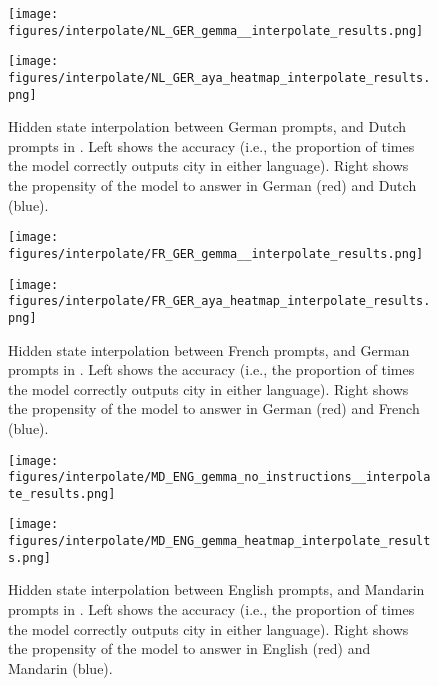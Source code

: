 \begin{figure}[h]
\begin{minipage}{0.49\textwidth}
    \centering
    \texttt{[image: figures/interpolate/NL\_GER\_gemma\_\_interpolate\_results.png]} 
\end{minipage}
\begin{minipage}{0.49\textwidth}
    \centering
    \texttt{[image: figures/interpolate/NL\_GER\_aya\_heatmap\_interpolate\_results.png]} 
\end{minipage}
\caption{Hidden state interpolation between German prompts, and Dutch prompts in \gemma. Left shows the accuracy (i.e., the proportion of times the model correctly outputs city in either language). Right shows the propensity of the model to answer in German (red) and Dutch (blue). }
\end{figure}

\begin{figure}[h]
\begin{minipage}{0.49\textwidth}
    \centering
    \texttt{[image: figures/interpolate/FR\_GER\_gemma\_\_interpolate\_results.png]} 
\end{minipage}
\begin{minipage}{0.49\textwidth}
    \centering
    \texttt{[image: figures/interpolate/FR\_GER\_aya\_heatmap\_interpolate\_results.png]} 
\end{minipage}
\caption{Hidden state interpolation between French prompts, and German prompts in \gemma. Left shows the accuracy (i.e., the proportion of times the model correctly outputs city in either language). Right shows the propensity of the model to answer in German (red) and French (blue). }
\end{figure}


\begin{figure}[h]
\begin{minipage}{0.49\textwidth}
    \centering
    \texttt{[image: figures/interpolate/MD\_ENG\_gemma\_no\_instructions\_\_interpolate\_results.png]} 
\end{minipage}
\begin{minipage}{0.49\textwidth}
    \centering
    \texttt{[image: figures/interpolate/MD\_ENG\_gemma\_heatmap\_interpolate\_results.png]} 
\end{minipage}
\caption{Hidden state interpolation between English prompts, and Mandarin prompts in \gemma. Left shows the accuracy (i.e., the proportion of times the model correctly outputs city in either language). Right shows the propensity of the model to answer in English (red) and Mandarin (blue). }
\end{figure}


